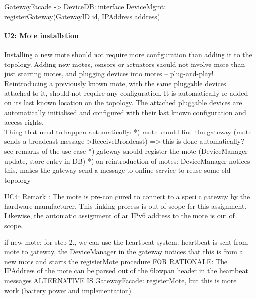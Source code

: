             GatewayFacade -> DeviceDB: interface DeviceMgmt: registerGateway(GatewayID id, IPAddress address)


    \paragraph{U2: Mote installation}
        Installing a new mote should not require more configuration than adding it
        to the topology. Adding new motes, sensors or actuators should not involve
        more than just starting motes, and plugging devices into motes – plug-and-play!
        Reintroducing a previously known mote, with the same pluggable devices attached to it,
        should not require any configuration. It is automatically re-added on
        its last known location on the topology. The attached pluggable devices
        are automatically initialised and configured with their last known
        configuration and access rights. \\
        Thing that need to happen automatically:
        *) mote should find the gateway (mote sends a broadcast message->ReceiveBroadcast) => this is done automatically? see remarks of the use case
        *) gateway should register the mote (DeviceManager update, store entry in DB)
        *) on reintroduction of motes: DeviceManager notices this, makes the gateway send a message to online service to reuse some old topology

        UC4:
            Remark : The mote is pre-congured to connect to a specic gateway by
             the hardware manufacturer. This linking process is out of scope for
             this assignment. Likewise, the automatic assignment of an IPv6 address
             to the mote is out of scope.

            if new mote:
                for step 2., we can use the heartbeat system. heartbeat is sent from mote to gateway,
                the DeviceManager in the gateway notices that this is from a new mote and starts
                the registerMote procedure
                FOR RATIONALE: The IPAddress of the mote can be parsed out of the 6lowpan header in the heartbeat messages
                ALTERNATIVE IS GatewayFacade: registerMote, but this is more work (battery power and implementation)

